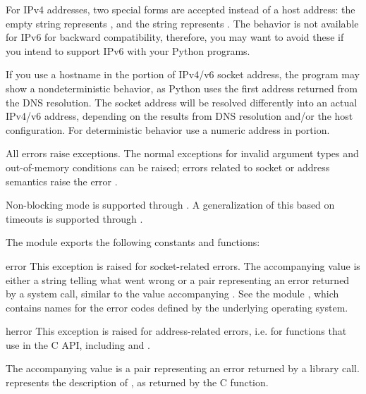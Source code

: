 For IPv4 addresses, two special forms are accepted instead of a host
address: the empty string represents , and the string
 represents .
The behavior is not available for IPv6 for backward compatibility,
therefore, you may want to avoid these if you intend to support IPv6 with
your Python programs.

If you use a hostname in the  portion of IPv4/v6 socket
address, the program may show a nondeterministic behavior, as Python
uses the first address returned from the DNS resolution.  The socket
address will be resolved differently into an actual IPv4/v6 address,
depending on the results from DNS resolution and/or the host
configuration.  For deterministic behavior use a numeric address in
 portion.

All errors raise exceptions.  The normal exceptions for invalid
argument types and out-of-memory conditions can be raised; errors
related to socket or address semantics raise the error
.

Non-blocking mode is supported through
.  A generalization of this based on timeouts
is supported through .

The module  exports the following constants and functions:


\begin{excdesc}{error}
This exception is raised for socket-related errors.
The accompanying value is either a string telling what went wrong or a
pair 
representing an error returned by a system
call, similar to the value accompanying .
See the module , which contains
names for the error codes defined by the underlying operating system.
\end{excdesc}

\begin{excdesc}{herror}
This exception is raised for address-related errors, i.e. for
functions that use  in the C API, including
 and .

The accompanying value is a pair 
representing an error returned by a library call. 
represents the description of , as returned by
the  C function.
\end{excdesc}

